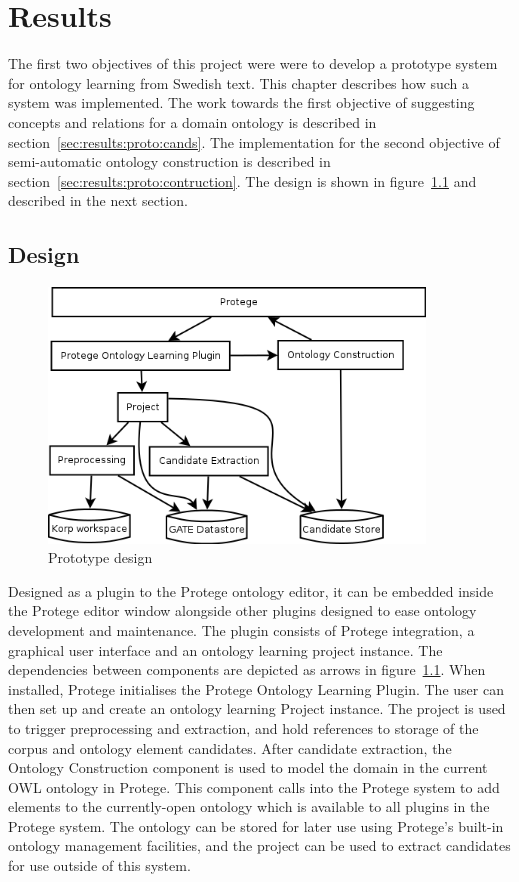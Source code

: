 \documentclass[a4paper]{report}
\begin{document}
\chapter{Results}
\label{chap:results}

The first two objectives of this project were were to develop a prototype system for ontology learning from Swedish text.
This chapter describes how such a system was implemented.
The work towards the first objective of suggesting concepts and relations for a domain ontology is described in section~\ref{sec:results:proto:cands}.
The implementation for the second objective of semi-automatic ontology construction is described in section~\ref{sec:results:proto:contruction}.
The design is shown in figure~\ref{fig:prototype-design} and described in the next section.

\section{Design}
\label{sec:results:design}

\begin{figure}[H]
  \includegraphics[width=10cm]{graphics/protege-plugin-components-simple.png}
  \caption{Prototype design}
  \label{fig:prototype-design}
\end{figure}

Designed as a plugin to the Protege ontology editor, it can be embedded inside the Protege editor window alongside other plugins designed to ease ontology development and maintenance.
The plugin consists of Protege integration, a graphical user interface and an ontology learning project instance.
The dependencies between components are depicted as arrows in figure~\ref{fig:prototype-design}.
When installed, Protege initialises the Protege Ontology Learning Plugin.
The user can then set up and create an ontology learning Project instance.
The project is used to trigger preprocessing and extraction, and hold references to storage of the corpus and ontology element candidates.
After candidate extraction, the Ontology Construction component is used to model the domain in the current OWL ontology in Protege.
This component calls into the Protege system to add elements to the currently-open ontology which is available to all plugins in the Protege system.
The ontology can be stored for later use using Protege's built-in ontology management facilities, and the project can be used to extract candidates for use outside of this system.
\end{document}
